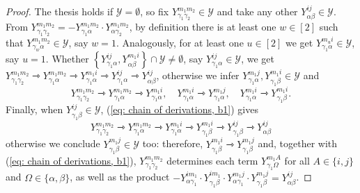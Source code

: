 \documentclass[10pt]{article}
\theoremstyle{remark}%
\theoremstyle{definition}%
\begin{document}
\begin{proof}
The thesis holds if $\mathcal{Y}=\emptyset$, so fix $Y_{\gamma_{1}\gamma_{2}}^{m_{1}m_{2}}\in\mathcal{Y}$ and take any other $Y_{\alpha\beta}^{ij}\in\mathcal{Y}$. From $Y_{\gamma_{1}\gamma_{2}}^{m_{1}m_{2}}=-Y_{\gamma_{1}\alpha}^{m_{1}m_{2}}\cdot Y_{\alpha\gamma_{2}}^{m_{1}m_{2}}$, by definition there is at least one $w\in[2]$ such that $Y_{\gamma_{w}\alpha}^{m_{1}m_{2}}\in\mathcal{Y}$, say $w=1$. Analogously, 
for at least one $u\in[2]$ we get $Y_{\gamma_{1}\alpha}^{m_{u}i}\in\mathcal{Y}$, say $u=1$. Whether $\left\{ Y_{\gamma_{1}\alpha}^{ij},Y_{\alpha\beta}^{m_{1}i}\right\} \cap\mathcal{Y}\neq\emptyset$, say $Y_{\gamma_{1}\alpha}^{ij}\in\mathcal{Y}$, we get 
$
Y_{\gamma_{1}\gamma_{2}}^{m_{1}m_{2}}\rightarrowtriangle Y_{\gamma_{1}\alpha}^{m_{1}m_{2}}\rightarrowtriangle Y_{\gamma_{1}\alpha}^{m_{1}i}\rightarrowtriangle Y_{\gamma_{1}\alpha}^{ij}\rightarrowtriangle Y_{\alpha\beta}^{ij}
$,
otherwise we infer $Y_{\gamma_{1}\alpha}^{m_{1}j},Y_{\gamma_{1}\beta}^{m_{1}i}\in\mathcal{Y}$ and 
\begin{equation}
Y_{\gamma_{1}\gamma_{2}}^{m_{1}m_{2}}\rightarrowtriangle Y_{\gamma_{1}\alpha}^{m_{1}m_{2}}\rightarrowtriangle Y_{\gamma_{1}\alpha}^{m_{1}i},\quad Y_{\gamma_{1}\alpha}^{m_{1}i}\rightarrowtriangle Y_{\gamma_{1}\alpha}^{m_{1}j},\quad Y_{\gamma_{1}\alpha}^{m_{1}i}\rightarrowtriangle Y_{\gamma_{1}\beta}^{m_{1}i}.
\label{eq: chain of derivations, b1}
\end{equation}
Finally, when $Y_{\gamma_{1}\beta}^{ij}\in\mathcal{Y}$, (\ref{eq: chain of derivations, b1}) gives
\begin{equation}
Y_{\gamma_{1}\gamma_{2}}^{m_{1}m_{2}}\rightarrowtriangle Y_{\gamma_{1}\alpha}^{m_{1}m_{2}}\rightarrowtriangle Y_{\gamma_{1}\alpha}^{m_{1}i}\rightarrowtriangle Y_{\gamma_{1}\beta}^{m_{1}i}\rightarrowtriangle Y_{\gamma_{1}\beta}^{ij}\rightarrowtriangle Y_{\alpha\beta}^{ij}
\label{eq: chain of derivations, b2}
\end{equation}
otherwise we conclude $Y_{\gamma_{1}\beta}^{m_{1}j}\in\mathcal{Y}$ too: therefore, $Y_{\gamma_{1}\beta}^{m_{1}i}\rightarrowtriangle Y_{\gamma_{1}\beta}^{m_{1}j}$ and, together with (\ref{eq: chain of derivations, b1}), $Y_{\gamma_{1}\gamma_{2}}^{m_{1}m_{2}}$ determines each term $Y_{\gamma_{1}\Omega}^{m_{1}A}$ for all $A\in\{i,j\}$ and $\Omega\in\{\alpha,\beta\}$, as well as the product $-Y_{\alpha\gamma_{1}}^{im_{1}}\cdot Y_{\gamma_{1}\beta}^{im_{1}}\cdot Y_{\alpha\gamma_{1}}^{m_{1}j}\cdot Y_{\gamma_{1}\beta}^{m_{1}j}=Y_{\alpha\beta}^{ij}$. 
\end{proof}
\end{document}
